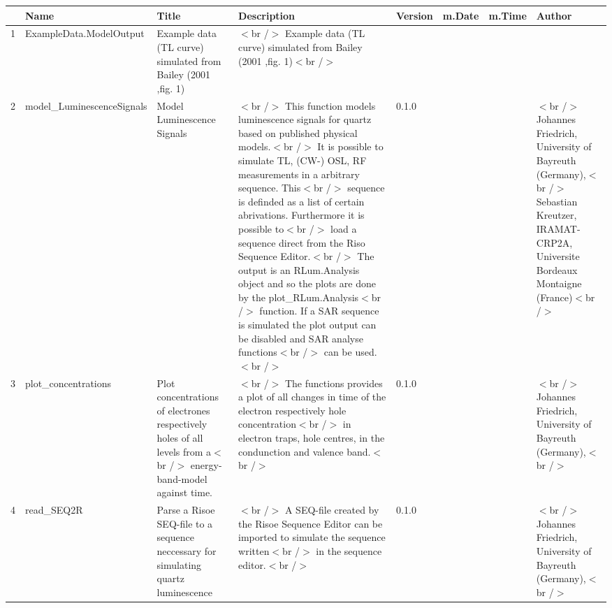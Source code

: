 \begin{table}[ht]
\centering
\begin{tabular}{rlllllll}
  \hline
 & Name & Title & Description & Version & m.Date & m.Time & Author \\ 
  \hline
1 & ExampleData.ModelOutput & Example data (TL curve) simulated from Bailey (2001 ,fig. 1) & $<$br /$>$ Example data (TL curve) simulated from Bailey (2001 ,fig. 1)$<$br /$>$ &  &  &  &  \\ 
  2 & model\_LuminescenceSignals & Model Luminescence Signals & $<$br /$>$ This function models luminescence signals for quartz based on published physical models.$<$br /$>$ It is possible to simulate TL, (CW-) OSL, RF measurements in a arbitrary sequence. This$<$br /$>$ sequence is definded as a list of certain abrivations. Furthermore it is possible to$<$br /$>$ load a sequence direct from the Riso Sequence Editor.$<$br /$>$ The output is an RLum.Analysis object and so the plots are done by the plot\_RLum.Analysis$<$br /$>$ function. If a SAR sequence is simulated the plot output can be disabled and SAR analyse functions$<$br /$>$ can be used.$<$br /$>$ & 0.1.0
 &  &  & $<$br /$>$ Johannes Friedrich, University of Bayreuth (Germany),$<$br /$>$ Sebastian Kreutzer, IRAMAT-CRP2A, Universite Bordeaux Montaigne (France)$<$br /$>$ \\ 
  3 & plot\_concentrations & Plot concentrations of electrones respectively holes of all levels from a$<$br /$>$ energy-band-model against time. & $<$br /$>$ The functions provides a plot of all changes in time of the electron respectively hole concentration$<$br /$>$ in electron traps, hole centres, in the condunction and valence band.$<$br /$>$ & 0.1.0
 &  &  & $<$br /$>$ Johannes Friedrich, University of Bayreuth (Germany),$<$br /$>$ \\ 
  4 & read\_SEQ2R & Parse a Risoe SEQ-file to a sequence neccessary for simulating quartz luminescence & $<$br /$>$ A SEQ-file created by the Risoe Sequence Editor can be imported to simulate the sequence written$<$br /$>$ in the sequence editor.$<$br /$>$ & 0.1.0
 &  &  & $<$br /$>$ Johannes Friedrich, University of Bayreuth (Germany),$<$br /$>$ \\ 
   \hline
\end{tabular}
\end{table}

